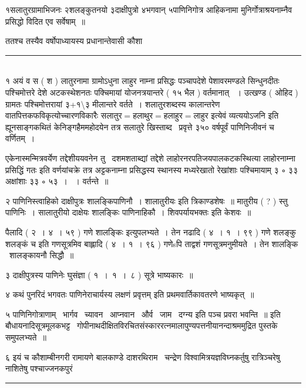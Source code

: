 \documentclass[11pt, openany]{book}
\begin{document}
\begin{multicols}{2}
१सलातुरग्रामाभिजनः २शलङ्कुतनयो ३दाक्षीपुत्रो ४भगवान् ५पाणिनिगोत्र आहिकनामा मुनिर्गोत्राश्रयनाम्नैव प्रसिद्धो विदित एव सर्वेषाम्~॥

ततश्च तस्यैव वर्षोपाध्यायस्य प्रधानान्तेवासी कौशा \textendash\

\noindent
\rule{1\linewidth}{0.5pt}\\

१ अयं व स ( श ) लातुरनामा ग्रामोऽधुना लाहुर नाम्ना प्रसिद्धः पञ्चापदेशे पेशावरमण्डले सिन्धुनदीतः पश्चिमोत्तरे देशे अटकस्थेशनतः पक्चिमायां योजनत्रयान्तरे ( १५ भैल ) वर्तमानात् ~। उत्खण्ड ( ओहिद ) ग्रामतः पश्चिमोत्तरायां ३+१\textbackslash३ मीलान्तरे वर्तते~। शलातुरशब्दस्य कालान्तरेण वातपित्तकफविकृत्योच्चारणविकारैः सलातुर$=$हलाथुर$=$हलाहुर$=$लाहुर इत्येवं व्यत्ययोऽजनि इति ह्यूनसाङ्गकथितं केनिङ्गहैममहोदयेन तत्र सलातुरे खिस्ताब्द \textendash\ प्रवृत्ते ३५० वर्षपूर्वं पाणिनिजीवनं च वर्णितम्~।

एकेनास्मन्मित्रवर्येण तद्देशीययवनेन तु \textendash\ {\qt दशमशताब्द्यां तद्देशे लाहोरनरपतिजयपालकटकस्थित्या लाहोरनाम्ना प्रसिद्धिं गतः} इति वर्णयांचक्रे तत्र अट्टकनाम्ना प्रसिद्धस्य स्थानस्य मध्यरेखातो रेखांशाः पश्चिमायाम् ३ ∘ ३३ अक्षांशाः ३३ ∘ ५३~। ~। वर्तन्ते~॥

२ पाणिनिस्त्वाहिको दाक्षीपुत्रः शालङ्किपाणिनौ~। शालातुरीयः इति त्रिकाण्डशेषः~॥ मातुरीय ( ? ) स्तु पाणिनिः~। सालातुरीयो दाक्षेयः शालङ्किः पाणिनाहिकौ~। शिवपर्यायभक्तः इति केशवः~॥

पैलादि ( २~। ४~। ५९ ) गणे {\qt शालङ्किः} इत्युपलभ्यते~। तेन नढादि ( ४~। १~। ९९ ) गणे {\qt शलङ्कु शलङ्कं च इति गणसूत्रमिव} बाह्लादि ( ४~। १~। ९६ ) गणेsपि ताद्वशं गणसूत्रमनुमीयते~। तेन शालङ्कि \textendash\ शालङ्कायनौ सिद्धौ~॥

३ {\qt दाक्षीपुत्रस्य पाणिनेः} घुसंज्ञा ( १~।~१~।~८ ) सूत्रे भाष्यकारः~॥

४ {\qt कथं पुनरिदं भगवतः पाणिनेराचार्यस्य लक्षणं प्रवृत्तम्} इति प्रथमवार्तिकावतरणे भाष्यकृत्~॥

५ पाणिनिगोत्राणाम् \textendash\ {\qt भार्गव \textendash\ च्यावन \textendash\ आप्नवान \textendash\ और्व \textendash\ जाम \textendash\ दग्न्य} इति पञ्च प्रवरा भवन्ति~॥ इति बौधायनादिसूत्रमूलकभट्ट \textendash\ गोपीनाथदीक्षितविरचितसंस्काररत्नमालापुण्यपत्तनीयानन्दाश्रममुद्रित पुस्तके समुपलभ्यते~॥

६ इयं च कौशाम्बीनगरी रामायणे बालकाण्डे दाशरथिराम \textendash\ चन्द्रेण विश्वामित्रयज्ञविघ्नकर्तुषु रात्रिञ्चरेषु नाशितेषु पश्चाज्जनकपुरं

\noindent
\rule{1\linewidth}{0.5pt}\\


\end{multicols}
\end{document}
